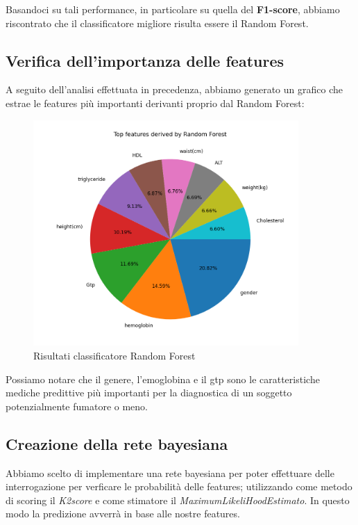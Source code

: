 \documentclass{article}
\begin{document}
\noindent
Basandoci su tali performance, in particolare su quella del \textbf{F1-score}, abbiamo riscontrato che il classificatore migliore risulta essere il Random Forest.

\subsection{Verifica dell'importanza delle features}
A seguito dell'analisi effettuata in precedenza, abbiamo generato un grafico che estrae le features più importanti derivanti proprio dal Random Forest:  

\begin{figure}[H]
        \includegraphics[width=0.9\textwidth]{Grafico3}
        \centering
        \caption{Risultati classificatore Random Forest}
        \centering
\end{figure}
%

\noindent
Possiamo notare che il genere, l'emoglobina e il gtp
sono le caratteristiche mediche predittive più importanti per la diagnostica di un soggetto potenzialmente fumatore o meno.

\subsection{Creazione della rete bayesiana}
Abbiamo scelto di implementare una rete bayesiana per poter effettuare delle interrogazione per verficare le probabilità delle features; utilizzando come metodo di scoring il \textit{K2score} e come stimatore il \textit{MaximumLikeliHoodEstimato}. In questo modo la predizione avverrà in base alle nostre features.\\
%
\end{document}
